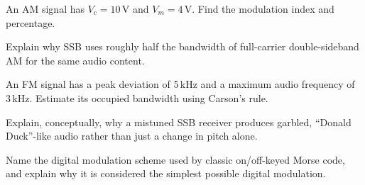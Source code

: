 \begin{practiceproblems}
\item An AM signal has $V_c = 10\,\text{V}$ and $V_m = 4\,\text{V}$.
Find the modulation index and percentage.
\item Explain why SSB uses roughly half the bandwidth of full-carrier
double-sideband AM for the same audio content.
\item An FM signal has a peak deviation of 5\,kHz and a maximum audio
frequency of 3\,kHz. Estimate its occupied bandwidth using Carson's
rule.
\item Explain, conceptually, why a mistuned SSB receiver produces
garbled, ``Donald Duck''-like audio rather than just a change in pitch
alone.
\item Name the digital modulation scheme used by classic on/off-keyed
Morse code, and explain why it is considered the simplest possible
digital modulation.
\end{practiceproblems}
